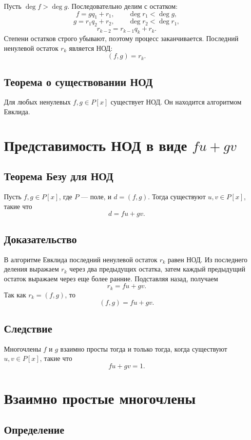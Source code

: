 \documentclass[12pt,a4paper]{article}
\begin{document}
Пусть $\deg f>\deg g$. Последовательно делим с остатком:
\[
    f=gq_1+r_1,\qquad \deg r_1<\deg g,
\]
\[
    g=r_1q_2+r_2,\qquad \deg r_2<\deg r_1,
\]
\[
    r_{k-2}=r_{k-1}q_k+r_k.
\]
Степени остатков строго убывают, поэтому процесс заканчивается. Последний ненулевой остаток $r_k$ является НОД:
\[
    (f,g)=r_k.
\]

\subsection*{Теорема о существовании НОД}

Для любых ненулевых $f,g\in P[x]$ существует НОД. Он находится алгоритмом Евклида.

\section{Представимость НОД в виде $fu+gv$}

\subsection*{Теорема Безу для НОД}

Пусть $f,g\in P[x]$, где $P$ --- поле, и $d=(f,g)$. Тогда существуют $u,v\in P[x]$, такие что
\[
    d=fu+gv.
\]

\subsection*{Доказательство}

В алгоритме Евклида последний ненулевой остаток $r_k$ равен НОД. Из последнего деления выражаем $r_k$ через два предыдущих остатка, затем каждый предыдущий остаток выражаем через еще более ранние. Подставляя назад, получаем
\[
    r_k=fu+gv.
\]
Так как $r_k=(f,g)$, то
\[
    (f,g)=fu+gv.
\]

\subsection*{Следствие}

Многочлены $f$ и $g$ взаимно просты тогда и только тогда, когда существуют $u,v\in P[x]$, такие что
\[
    fu+gv=1.
\]

\section{Взаимно простые многочлены}

\subsection*{Определение}
\end{document}
